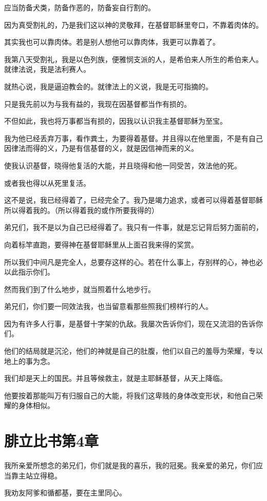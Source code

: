 \documentclass[12pt,oneside]{book}
\begin{document}
应当防备犬类，防备作恶的，防备妄自行割的。

因为真受割礼的，乃是我们这以神的灵敬拜，在基督耶稣里夸口，不靠着肉体的。

其实我也可以靠肉体。若是别人想他可以靠肉体，我更可以靠着了。

我第八天受割礼，我是以色列族，便雅悯支派的人，是希伯来人所生的希伯来人。就律法说，我是法利赛人。

就热心说，我是逼迫教会的。就律法上的义说，我是无可指摘的。

只是我先前以为与我有益的，我现在因基督都当作有损的。

不但如此，我也将万事都当有损的，因我以认识我主基督耶稣为至宝。

我为他已经丢弃万事，看作粪土，为要得着基督。并且得以在他里面，不是有自己因律法而得的义，乃是有信基督的义，就是因信神而来的义。

使我认识基督，晓得他复活的大能，并且晓得和他一同受苦，效法他的死。

或者我也得以从死里复活。

这不是说，我已经得着了，已经完全了。我乃是竭力追求，或者可以得着基督耶稣所以得着我的。（所以得着我的或作所要我得的）

弟兄们，我不是以为自己已经得着了。我只有一件事，就是忘记背后努力面前的，

向着标竿直跑，要得神在基督耶稣里从上面召我来得的奖赏。

所以我们中间凡是完全人，总要存这样的心。若在什么事上，存别样的心，神也必以此指示你们。

然而我们到了什么地步，就当照着什么地步行。

弟兄们，你们要一同效法我，也当留意看那些照我们榜样行的人。

因为有许多人行事，是基督十字架的仇敌。我屡次告诉你们，现在又流泪的告诉你们。

他们的结局就是沉沦，他们的神就是自己的肚腹，他们以自己的羞辱为荣耀，专以地上的事为念。

我们却是天上的国民。并且等候救主，就是主耶稣基督，从天上降临。

他要按着那能叫万有归服自己的大能，将我们这卑贱的身体改变形状，和他自己荣耀的身体相似。

\chapter{腓立比书第4章}
我所亲爱所想念的弟兄们，你们就是我的喜乐，我的冠冕。我亲爱的弟兄，你们应当靠主站立得稳。

我劝友阿爹和循都基，要在主里同心。
\end{document}
